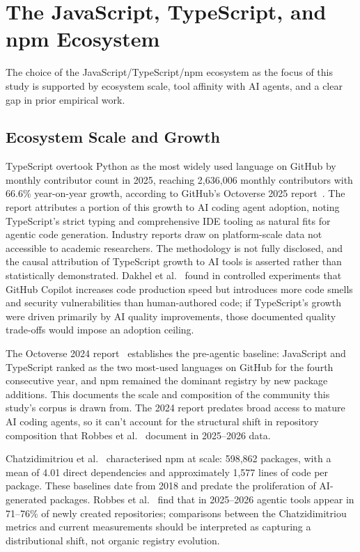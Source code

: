 \section{The JavaScript, TypeScript, and npm Ecosystem}
\label{sec:lr:ecosystem}

The choice of the JavaScript/TypeScript/npm ecosystem as the focus of this study is supported by ecosystem scale, tool affinity with AI agents, and a clear gap in prior empirical work.

\subsection{Ecosystem Scale and Growth}

TypeScript overtook Python as the most widely used language on GitHub by monthly contributor count in 2025, reaching 2,636,006 monthly contributors with 66.6\% year-on-year growth, according to GitHub's Octoverse 2025 report~\cite{octoverse2025}. The report attributes a portion of this growth to AI coding agent adoption, noting TypeScript's strict typing and comprehensive IDE tooling as natural fits for agentic code generation. Industry reports draw on platform-scale data not accessible to academic researchers. The methodology is not fully disclosed, and the causal attribution of TypeScript growth to AI tools is asserted rather than statistically demonstrated. Dakhel et al.~\cite{dakhel2023} found in controlled experiments that GitHub Copilot increases code production speed but introduces more code smells and security vulnerabilities than human-authored code; if TypeScript's growth were driven primarily by AI quality improvements, those documented quality trade-offs would impose an adoption ceiling.

The Octoverse 2024 report~\cite{octoverse2024} establishes the pre-agentic baseline: JavaScript and TypeScript ranked as the two most-used languages on GitHub for the fourth consecutive year, and npm remained the dominant registry by new package additions. This documents the scale and composition of the community this study's corpus is drawn from. The 2024 report predates broad access to mature AI coding agents, so it can't account for the structural shift in repository composition that Robbes et al.~\cite{robbesAgenticVery2026} document in 2025--2026 data.

Chatzidimitriou et al.~\cite{chatzidimitriou2018} characterised npm at scale: 598,862 packages, with a mean of 4.01 direct dependencies and approximately 1,577 lines of code per package. These baselines date from 2018 and predate the proliferation of AI-generated packages. Robbes et al.~\cite{robbesAgenticVery2026} find that in 2025--2026 agentic tools appear in 71--76\% of newly created repositories; comparisons between the Chatzidimitriou metrics and current measurements should be interpreted as capturing a distributional shift, not organic registry evolution.

